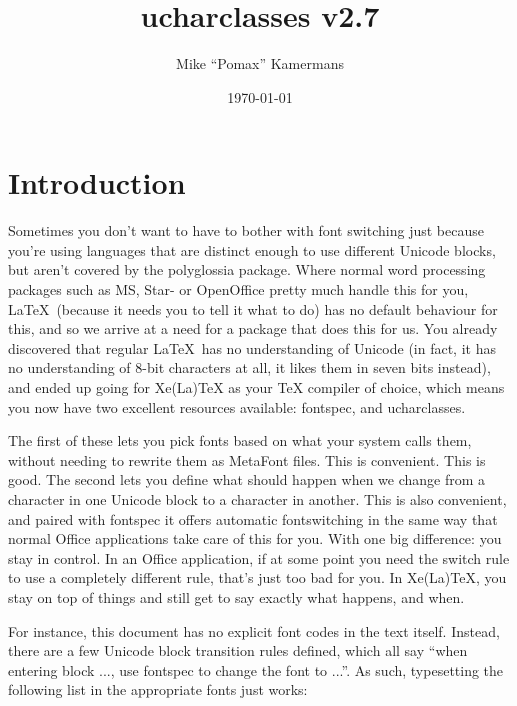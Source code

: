 \documentclass{article}
\begin{document}
  \title{ucharclasses v2.7}
  \author{Mike “Pomax” Kamermans}
  \date{\today}
  \maketitle

  \tableofcontents

  \pagebreak

  \section{Introduction}

    Sometimes you don't want to have to bother with font switching just because you're using languages that are distinct enough to use different Unicode blocks, but aren't covered by the polyglossia package. Where normal word processing packages such as MS, Star- or OpenOffice pretty much handle this for you, \LaTeX\ (because it needs you to tell it what to do) has no default behaviour for this, and so we arrive at a need for a package that does this for us. You already discovered that regular \LaTeX\ has no understanding of Unicode (in fact, it has no understanding of 8-bit characters at all, it likes them in seven bits instead), and ended up going for Xe(La)TeX as your TeX compiler of choice, which means you now have two excellent resources available: fontspec, and ucharclasses.

    The first of these lets you pick fonts based on what your system calls them, without needing to rewrite them as MetaFont files. This is convenient. This is good. The second lets you define what should happen when we change from a character in one Unicode block to a character in another. This is also convenient, and paired with fontspec it offers automatic fontswitching in the same way that normal Office applications take care of this for you. With one big difference: you stay in control. In an Office application, if at some point you need the switch rule to use a completely different rule, that's just too bad for you. In Xe(La)TeX, you stay on top of things and still get to say exactly what happens, and when.

    For instance, this document has no explicit font codes in the text itself. Instead, there are a few Unicode block transition rules defined, which all say “when entering block ..., use fontspec to change the font to ...”. As such, typesetting the following list in the appropriate fonts just works:
\end{document}
